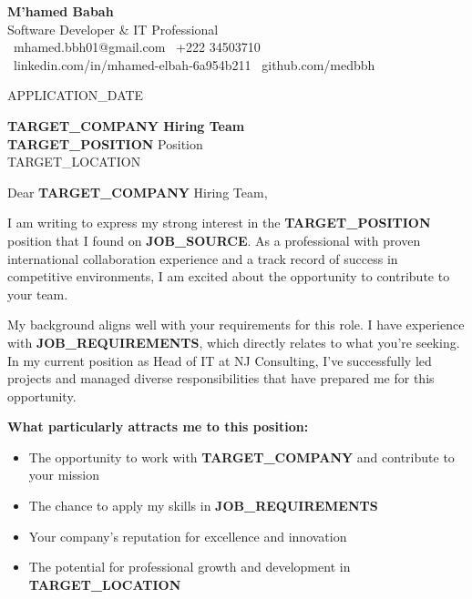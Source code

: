 \documentclass[11pt,a4paper]{letter}
\newcommand{\highlight}[1]{\textcolor{primarycolor}{\textbf{#1}}}
\begin{document}
\begin{center}
{\Large \textbf{\textcolor{primarycolor}{M'hamed Babah}}} \\
\vspace{0.2cm}
{\textcolor{secondarycolor}{Software Developer \& IT Professional}} \\
\vspace{0.3cm}
\textcolor{secondarycolor}{\faEnvelope\ mhamed.bbh01@gmail.com \quad \faPhone\ +222 34503710} \\
\textcolor{secondarycolor}{\faLinkedin\ linkedin.com/in/mhamed-elbah-6a954b211 \quad \faGithub\ github.com/medbbh}
\end{center}

\vspace{0.5cm}

\begin{flushright}
{APPLICATION_DATE}
\end{flushright}

\vspace{0.3cm}

\begin{flushleft}
\textbf{{TARGET_COMPANY} Hiring Team} \\
\highlight{{TARGET_POSITION}} Position \\
{TARGET_LOCATION}
\end{flushleft}

\vspace{0.5cm}

Dear \highlight{{TARGET_COMPANY}} Hiring Team,

\vspace{0.3cm}

I am writing to express my strong interest in the \highlight{{TARGET_POSITION}} position that I found on \textbf{{JOB_SOURCE}}. As a professional with proven international collaboration experience and a track record of success in competitive environments, I am excited about the opportunity to contribute to your team.

My background aligns well with your requirements for this role. I have experience with \textbf{{JOB_REQUIREMENTS}}, which directly relates to what you're seeking. In my current position as Head of IT at NJ Consulting, I've successfully led projects and managed diverse responsibilities that have prepared me for this opportunity.

\textbf{What particularly attracts me to this position:}
\begin{itemize}
\item The opportunity to work with \highlight{{TARGET_COMPANY}} and contribute to your mission
\item The chance to apply my skills in \textbf{{JOB_REQUIREMENTS}}
\item Your company's reputation for excellence and innovation
\item The potential for professional growth and development in \textbf{{TARGET_LOCATION}}
\end{itemize}
\end{document}
